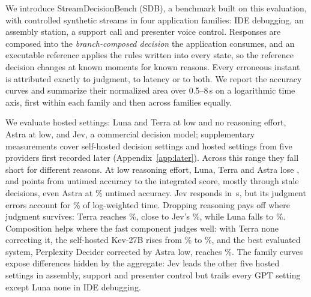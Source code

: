 \documentclass[11pt]{article}
\newcommand{\sdb}{SDB}
\begin{document}
We introduce StreamDecisionBench (\sdb), a benchmark built on this evaluation, with controlled synthetic streams in four application families: IDE debugging, an assembly station, a support call and presenter voice control.
Responses are composed into the \emph{branch-composed decision} the application consumes, and an executable reference applies the rules written into every state, so the reference decision changes at known moments for known reasons.
Every erroneous instant is attributed exactly to judgment, to latency or to both. We report the accuracy curves and summarize their normalized area over 0.5--8\,s on a logarithmic time axis, first within each family and then across families equally.

We evaluate \NumSettingsWord{} hosted settings: Luna and Terra at low and no reasoning effort, Astra at low, and Jev, a commercial decision model; supplementary measurements cover \OwNumSettingsWord{} self-hosted decision settings and \LaterNumSettingsWord{} hosted settings from five providers first recorded later (Appendix~\ref{app:later}).
Across this range they fall short for different reasons.
At low reasoning effort, Luna, Terra and Astra lose \LunaAucGap, \TerraAucGap{} and \AstraAucGap{} points from untimed accuracy to the integrated score, mostly through stale decisions, even Astra at \AstraUntimed\% untimed accuracy.
Jev responds in \JevLatencyMedian\,s, but its judgment errors account for \JevAucJudgment\% of log-weighted time.
Dropping reasoning pays off where judgment survives: Terra reaches \TerraNoneAuc\%, close to Jev's \JevAuc\%, while Luna falls to \LunaNoneAuc\%.
Composition helps where the fast component judges well: with Terra none correcting it, the self-hosted Kev-27B rises from \OwKevTwentySevenAuc\% to \OwKevTwentySevenFreshestAuc\%, and the best evaluated system, Perplexity Decider corrected by Astra low, reaches \LaterBestAuc\%.
The family curves expose differences hidden by the aggregate: Jev leads the other five hosted settings in assembly, support and presenter control but trails every GPT setting except Luna none in IDE debugging.
\end{document}
